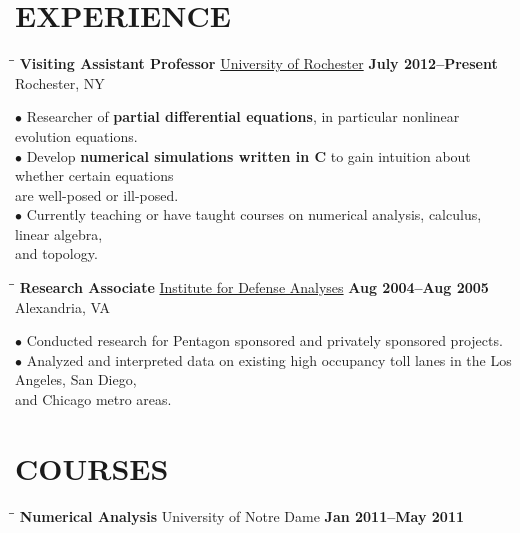 \documentclass{resume}
\begin{document}
\begin{resume}
\begin{tabbing}
    \end{tabbing}

    \section{EXPERIENCE}
    \vspace{-0.1in}
    \begin{tabbing}
        \hspace{2.3in}\= \hspace{2.6in}\= \kill
        {\bf Visiting Assistant Professor} \>\href{http://math.rochester.edu/}{University of Rochester}     
        \>\textbf{July 2012--Present} \\
        \>Rochester, NY 
    \end{tabbing}\vspace{-15pt}    
    $\bullet$ Researcher of \textbf{partial differential equations}, in particular nonlinear evolution equations.  
    \\
    $\bullet$ Develop \textbf{numerical simulations written in C} to gain intuition about whether certain equations \\ \phantom{$\bullet$} are 
    well-posed or ill-posed.
    \\
    $\bullet$ Currently teaching or have taught courses on numerical analysis, calculus, linear algebra, \\ \phantom{$\bullet$} and topology. 
    \begin{tabbing}
        \hspace{2.3in}\= \hspace{2.6in}\= \kill
        {\bf Research Associate } \>\href{https://www.ida.org/}{Institute for
        Defense Analyses} \>  
        \textbf{Aug 2004--Aug 2005}\\
        \>Alexandria, VA
    \end{tabbing}\vspace{-15pt}
    $\bullet$ Conducted research for Pentagon sponsored and privately
    sponsored projects. 
    \\ 
    $\bullet$ Analyzed and interpreted data on existing high occupancy toll lanes in 
    the Los
    Angeles, San Diego, \\
    \phantom{$\bullet$} 
    and
    Chicago metro areas.  
    \section{COURSES}
    \vspace{-0.1in}
    \begin{tabbing}
        \hspace{2.3in}\= \hspace{2.6in}\= \kill
        {\bf Numerical Analysis} \>University of Notre Dame    
        \>\textbf{Jan 2011--May 2011} 
    \end{tabbing}
    \vspace{-0.4in}


\end{resume}
\end{document}
